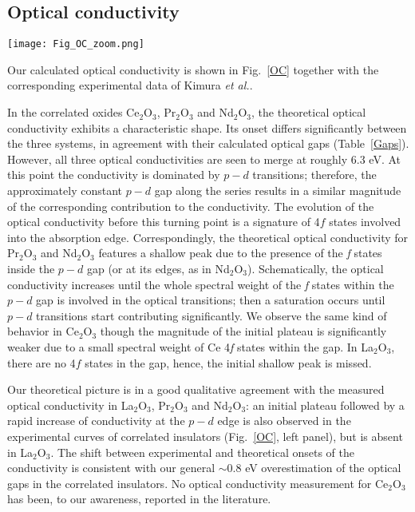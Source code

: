 \documentclass[aps,prb,twocolumn,amsmath,amssymb]{revtex4}
\begin{document}
\subsection{Optical conductivity}

\begin{figure*}
	\begin{centering}
		\texttt{[image: Fig\_OC\_zoom.png]}
		\par\end{centering}
	\caption{Measured\cite{Kimura2000} (left panel) and calculated in this work (right panel) optical conductivity of $R_{2}$O$_{3}$. Inset: zoom in the low energy region.} 
	\label{OC} 
\end{figure*}

Our calculated  optical conductivity is shown in Fig.~\ref{OC} together with the corresponding  experimental data of Kimura {\it et al.}\cite{Kimura2000}. 

In the correlated oxides  Ce$_{2}$O$_{3}$, Pr$_{2}$O$_{3}$ and Nd$_{2}$O$_{3}$, the theoretical optical conductivity exhibits a characteristic shape. Its onset differs significantly between the three systems, in agreement with their calculated  optical gaps  (Table~\ref{Gaps}). However, all three
optical conductivities are seen to merge at roughly 6.3 eV. At this point the conductivity is dominated by $p-d$ transitions; therefore, the approximately constant $p-d$ gap along the series results in a similar magnitude of  the corresponding contribution to the conductivity.  The evolution of the optical conductivity before this turning point is a signature of 4$f$ states involved into the absorption edge.  Correspondingly, the theoretical optical conductivity for Pr$_{2}$O$_{3}$ and Nd$_{2}$O$_{3}$  features a shallow peak 
due to the presence of the \textit{f} states inside the $p-d$ gap (or at its edges, as in Nd$_2$O$_3$).   
Schematically,  the optical conductivity increases until the whole spectral weight of the \textit{f} states within the $p-d$ gap is involved in the optical transitions; then a saturation occurs until $p-d$ transitions start contributing significantly. We observe the same kind of behavior in Ce$_{2}$O$_{3}$ though the magnitude of the initial plateau is significantly weaker due to a small spectral weight of  Ce 4\textit{f} states within the gap.  In La$_2$O$_3$, there are no 4$f$ states in the gap, hence, the initial shallow peak is missed.

Our  theoretical  picture is in a good qualitative agreement with the measured optical conductivity in La$_2$O$_3$, Pr$_2$O$_3$ and Nd$_2$O$_3$: an initial  plateau followed by a rapid increase of conductivity at the $p-d$ edge is also observed in the experimental curves of correlated insulators (Fig.~\ref{OC}, left panel), but is absent in La$_2$O$_3$. The shift between experimental and theoretical onsets of the conductivity is  consistent with our general $\sim$0.8 eV overestimation of the optical gaps in the correlated insulators.
 No optical conductivity measurement for Ce$_2$O$_3$ has been, to our awareness, reported in the literature. 
 
\end{document}
